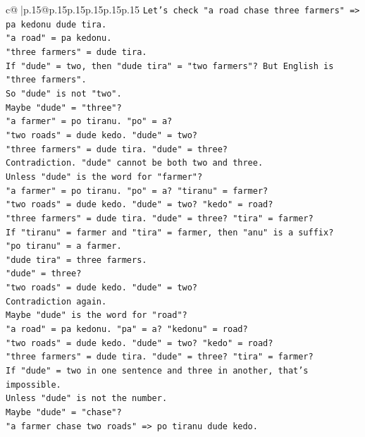 \documentclass{article}
\begin{document}
{\begin{supertabular}{c@{$\;$}|p{.15\linewidth}@{}p{.15\linewidth}p{.15\linewidth}p{.15\linewidth}p{.15\linewidth}p{.15\linewidth}}
{{{\texttt{Let's check "a road chase three farmers" => pa kedonu dude tira.} \\
\texttt{"a road" = pa kedonu.} \\
\texttt{"three farmers" = dude tira.} \\
\texttt{If "dude" = two, then "dude tira" = "two farmers"? But English is "three farmers".} \\
\texttt{So "dude" is not "two".} \\
\texttt{Maybe "dude" = "three"?} \\
\texttt{"a farmer" = po tiranu. "po" = a?} \\
\texttt{"two roads" = dude kedo. "dude" = two?} \\
\texttt{"three farmers" = dude tira. "dude" = three?} \\
\texttt{Contradiction. "dude" cannot be both two and three.} \\
\texttt{Unless "dude" is the word for "farmer"?} \\
\texttt{"a farmer" = po tiranu. "po" = a? "tiranu" = farmer?} \\
\texttt{"two roads" = dude kedo. "dude" = two? "kedo" = road?} \\
\texttt{"three farmers" = dude tira. "dude" = three? "tira" = farmer?} \\
\texttt{If "tiranu" = farmer and "tira" = farmer, then "anu" is a suffix?} \\
\texttt{"po tiranu" = a farmer.} \\
\texttt{"dude tira" = three farmers.} \\
\texttt{"dude" = three?} \\
\texttt{"two roads" = dude kedo. "dude" = two?} \\
\texttt{Contradiction again.} \\
\texttt{Maybe "dude" is the word for "road"?} \\
\texttt{"a road" = pa kedonu. "pa" = a? "kedonu" = road?} \\
\texttt{"two roads" = dude kedo. "dude" = two? "kedo" = road?} \\
\texttt{"three farmers" = dude tira. "dude" = three? "tira" = farmer?} \\
\texttt{If "dude" = two in one sentence and three in another, that's impossible.} \\
\texttt{Unless "dude" is not the number.} \\
\texttt{Maybe "dude" = "chase"?} \\
\texttt{"a farmer chase two roads" => po tiranu dude kedo.} \\
}}}
\end{supertabular}}
\end{document}
